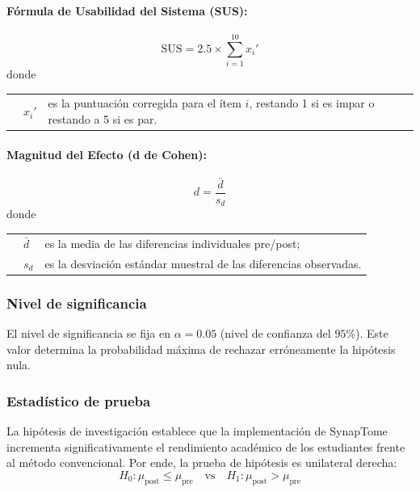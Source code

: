 \paragraph{Fórmula de Usabilidad del Sistema (SUS):}
\begin{equation}
\text{SUS} = 2.5 \times \sum_{i=1}^{10} x_i'
\end{equation}
\noindent donde

\noindent\begin{tabular}{@{} p{1cm} l p{8.0cm} @{}}
  & $x_i'$ & es la puntuación corregida para el ítem $i$, restando 1 si es impar o restando a 5 si es par.
\end{tabular}

\paragraph{Magnitud del Efecto (d de Cohen):}
\begin{equation}
d = \frac{\bar{d}}{s_d}
\end{equation}
\noindent donde

\noindent\begin{tabular}{@{} p{1cm} l p{8.0cm} @{}}
  & $\bar{d}$ & es la media de las diferencias individuales pre/post; \\
  & $s_d$ & es la desviación estándar muestral de las diferencias observadas.
\end{tabular}

\subsubsection{Nivel de significancia}
El nivel de significancia se fija en $\alpha = 0.05$ (nivel de confianza del $95\%$). Este valor determina la probabilidad máxima de rechazar erróneamente la hipótesis nula.

\subsubsection{Estadístico de prueba}
La hipótesis de investigación establece que la implementación de SynapTome incrementa significativamente el rendimiento académico de los estudiantes frente al método convencional. Por ende, la prueba de hipótesis es unilateral derecha:
\begin{equation}
H_0: \mu_{\text{post}} \leq \mu_{\text{pre}} \quad \text{vs} \quad H_1: \mu_{\text{post}} > \mu_{\text{pre}}
\end{equation}

